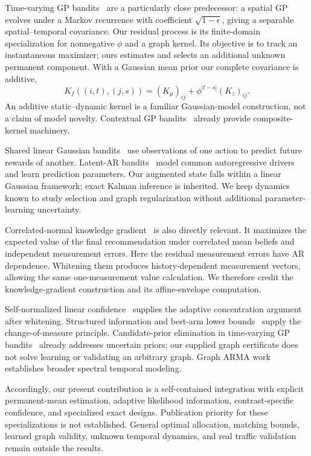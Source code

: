 \documentclass[11pt]{article}
\begin{document}
Time-varying GP bandits~\cite{bogunovic2016} are a particularly close predecessor: a spatial GP evolves under a Markov recurrence with coefficient $\sqrt{1-\epsilon}$, giving a separable spatial--temporal covariance. Our residual process is its finite-domain specialization for nonnegative $\phi$ and a graph kernel. Its objective is to track an instantaneous maximizer; ours estimates and selects an additional unknown permanent component. With a Gaussian mean prior our complete covariance is additive,
\begin{equation}
K_f((i,t),(j,s))=(K_\mu)_{ij}+\phi^{|t-s|}(K_z)_{ij}.
\label{eq:additive-kernel}
\end{equation}
An additive static--dynamic kernel is a familiar Gaussian-model construction, not a claim of model novelty. Contextual GP bandits~\cite{krause2011} already provide composite-kernel machinery.

Shared linear Gaussian bandits~\cite{gornet2024} use observations of one action to predict future rewards of another. Latent-AR bandits~\cite{trella2025} model common autoregressive drivers and learn prediction parameters. Our augmented state falls within a linear Gaussian framework; exact Kalman inference is inherited. We keep dynamics known to study selection and graph regularization without additional parameter-learning uncertainty.

Correlated-normal knowledge gradient~\cite{frazier2009} is also directly relevant. It maximizes the expected value of the final recommendation under correlated mean beliefs and independent measurement errors. Here the residual measurement errors have AR dependence. Whitening them produces history-dependent measurement vectors, allowing the same one-measurement value calculation. We therefore credit the knowledge-gradient construction and its affine-envelope computation.

Self-normalized linear confidence~\cite{abbasi2011} supplies the adaptive concentration argument after whitening. Structured information and best-arm lower bounds~\cite{combes2017,garivier2016} supply the change-of-measure principle. Candidate-prior elimination in time-varying GP bandits~\cite{ziomek2025} already addresses uncertain priors; our supplied graph certificate does not solve learning or validating an arbitrary graph. Graph ARMA work~\cite{guneyi2024} establishes broader spectral temporal modeling.

Accordingly, our present contribution is a self-contained integration with explicit permanent-mean estimation, adaptive likelihood information, contrast-specific confidence, and specialized exact designs. Publication priority for these specializations is not established. General optimal allocation, matching bounds, learned graph validity, unknown temporal dynamics, and real traffic validation remain outside the results.
\end{document}
